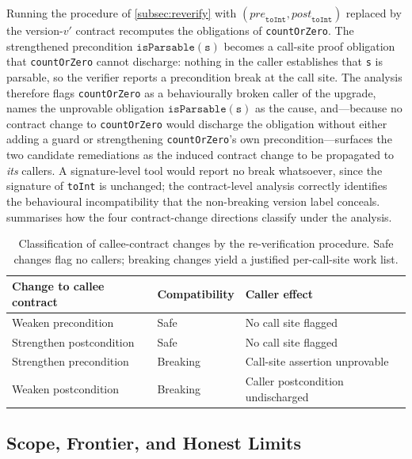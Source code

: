 Running the procedure of \cref{subsec:reverify} with
$(\mathit{pre}_{\mathtt{toInt}}, \mathit{post}_{\mathtt{toInt}})$ replaced by
the version-$v'$ contract recomputes the obligations of \texttt{countOrZero}.
The strengthened precondition $\mathtt{isParsable(s)}$ becomes a call-site proof
obligation that \texttt{countOrZero} cannot discharge: nothing in the caller
establishes that \texttt{s} is parsable, so the verifier reports a precondition
break at the call site. The analysis therefore flags \texttt{countOrZero} as a
behaviourally broken caller of the upgrade, names the unprovable obligation
$\mathtt{isParsable(s)}$ as the cause, and---because no contract change to
\texttt{countOrZero} would discharge the obligation without either adding a guard
or strengthening \texttt{countOrZero}'s own precondition---surfaces the two
candidate remediations as the induced contract change to be propagated to
\emph{its} callers. A signature-level tool would report no break whatsoever,
since the signature of \texttt{toInt} is unchanged; the contract-level analysis
correctly identifies the behavioural incompatibility that the non-breaking version
label conceals.  summarises how the four
contract-change directions classify under the analysis.

\begin{table}[t]
  \centering
  \caption{Classification of callee-contract changes by the re-verification
  procedure. Safe changes flag no callers; breaking changes yield a justified
  per-call-site work list.}
  \label{tab:propagation-outcomes}
  \begin{tabular}{@{}lll@{}}
    \toprule
    Change to callee contract & Compatibility & Caller effect \\
    \midrule
    Weaken precondition    & Safe     & No call site flagged \\
    Strengthen postcondition & Safe   & No call site flagged \\
    Strengthen precondition & Breaking & Call-site assertion unprovable \\
    Weaken postcondition    & Breaking & Caller postcondition undischarged \\
    \bottomrule
  \end{tabular}
\end{table}

\subsection{Scope, Frontier, and Honest Limits}\label{subsec:proplimits}

